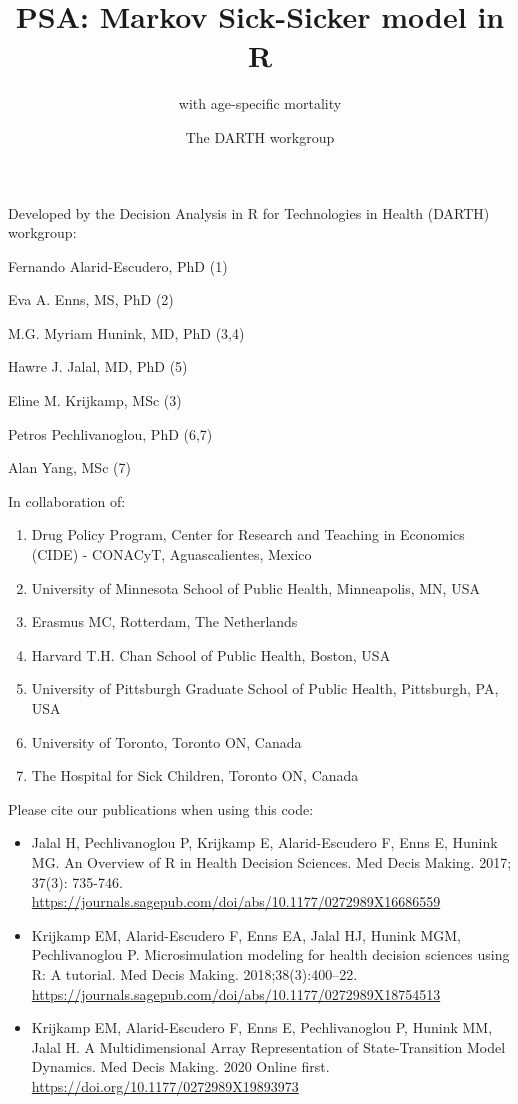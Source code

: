 \documentclass[
]{article}
\title{PSA: Markov Sick-Sicker model in R}
\subtitle{with age-specific mortality}
\author{The DARTH workgroup}
\date{}
\providecommand{\tightlist}{%
  \setlength{\itemsep}{0pt}\setlength{\parskip}{0pt}}
\begin{document}
\maketitle

Developed by the Decision Analysis in R for Technologies in Health
(DARTH) workgroup:

Fernando Alarid-Escudero, PhD (1)

Eva A. Enns, MS, PhD (2)

M.G. Myriam Hunink, MD, PhD (3,4)

Hawre J. Jalal, MD, PhD (5)

Eline M. Krijkamp, MSc (3)

Petros Pechlivanoglou, PhD (6,7)

Alan Yang, MSc (7)

In collaboration of:

\begin{enumerate}
\def\labelenumi{\arabic{enumi}.}
\tightlist
\item
  Drug Policy Program, Center for Research and Teaching in Economics
  (CIDE) - CONACyT, Aguascalientes, Mexico
\item
  University of Minnesota School of Public Health, Minneapolis, MN, USA
\item
  Erasmus MC, Rotterdam, The Netherlands
\item
  Harvard T.H. Chan School of Public Health, Boston, USA
\item
  University of Pittsburgh Graduate School of Public Health, Pittsburgh,
  PA, USA
\item
  University of Toronto, Toronto ON, Canada
\item
  The Hospital for Sick Children, Toronto ON, Canada
\end{enumerate}

Please cite our publications when using this code:

\begin{itemize}
\item
  Jalal H, Pechlivanoglou P, Krijkamp E, Alarid-Escudero F, Enns E,
  Hunink MG. An Overview of R in Health Decision Sciences. Med Decis
  Making. 2017; 37(3): 735-746.
  \url{https://journals.sagepub.com/doi/abs/10.1177/0272989X16686559}
\item
  Krijkamp EM, Alarid-Escudero F, Enns EA, Jalal HJ, Hunink MGM,
  Pechlivanoglou P. Microsimulation modeling for health decision
  sciences using R: A tutorial. Med Decis Making. 2018;38(3):400--22.
  \url{https://journals.sagepub.com/doi/abs/10.1177/0272989X18754513}
\item
  Krijkamp EM, Alarid-Escudero F, Enns E, Pechlivanoglou P, Hunink MM,
  Jalal H. A Multidimensional Array Representation of State-Transition
  Model Dynamics. Med Decis Making. 2020 Online first.
  \url{https://doi.org/10.1177/0272989X19893973}
\end{itemize}
\end{document}
